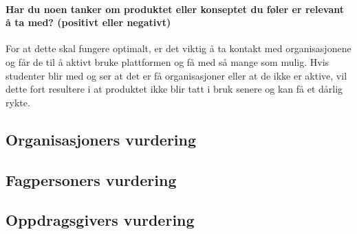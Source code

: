 \paragraph{Har du noen tanker om produktet eller konseptet du føler er relevant å ta med? (positivt eller negativt)}
For at dette skal fungere optimalt, er det viktig å ta kontakt med organisasjonene og får de til å aktivt bruke plattformen og få med så mange som mulig. Hvis studenter blir med og ser at det er få organisasjoner eller at de ikke er aktive, vil dette fort resultere i at produktet ikke blir tatt i bruk senere og kan få et dårlig rykte. 
\subsection{Organisasjoners vurdering}

\subsection{Fagpersoners vurdering}

\subsection{Oppdragsgivers vurdering}



